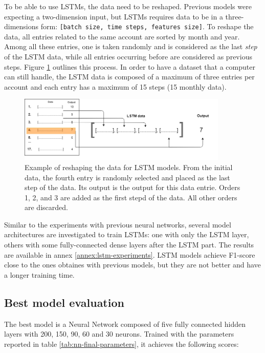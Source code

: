 To be able to use LSTMs, the data need to be reshaped. Previous models were expecting a two-dimension input, but LSTMs requires data to be in a three-dimensions form: \texttt{[batch size, time steps, features size]}. To reshape the data, all entries related to the same account are sorted by month and year. Among all these entries, one is taken randomly and is considered as the last \textit{step} of the LSTM data, while all entries occurring before are considered as previous steps. Figure \ref{fig:lst-data-build} outlines this process. In order to have a dataset that a computer can still handle, the LSTM data is composed of a maximum of three entries per account and each entry has a maximum of 15 steps (15 monthly data).

\begin{figure}[htbp]
    \centering
    \includegraphics[width=10cm]{images/lstm-data-build.png}
    \caption[LSTM data build]{Example of reshaping the data for LSTM models. From the initial data, the fourth entry is randomly selected and placed as the last step of the data. Its output is the output for this data entrie. Orders 1, 2, and 3 are added as the first stepd of the data. All other orders are discarded.}
    \label{fig:lst-data-build}
\end{figure}

Similar to the experiments with previous neural networks, several model architectures are investigated to train LSTMs: one with only the LSTM layer, others with some fully-connected dense layers after the LSTM part. The results are available in annex \ref{annex:lstm-experiments}. LSTM models achieve F1-score close to the ones obtaines with previous models, but they are not better and have a longer training time.



\subsection{Best model evaluation}
\label{sec:best-model}

The best model is a Neural Network composed of five fully connected hidden layers with 200, 150, 90, 60 and 30 neurons. Trained with the parameters reported in table \ref{tab:nn-final-parameters}, it achieves the following scores:

